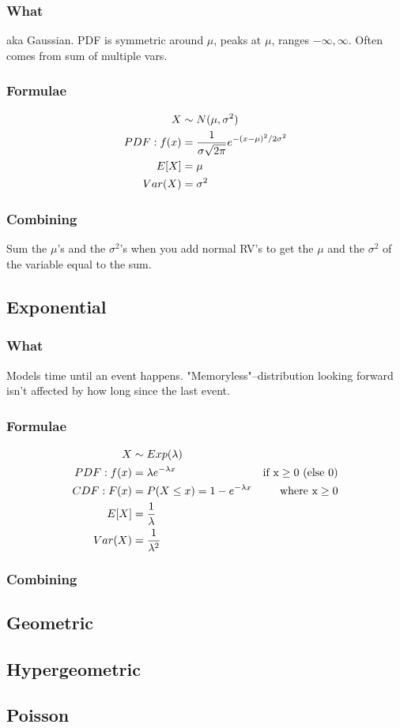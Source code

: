 \documentclass[12pt]{amsart}
\begin{document}
\subsubsection{What}
aka Gaussian. PDF is symmetric around $\mu$, peaks at $\mu$, ranges $-\infty, \infty$. Often comes from sum of multiple vars.
\subsubsection{Formulae}
\begin{align*}
X &\sim N(\mu, \sigma^2) \\
PDF: f(x) &= {1 \over \sigma \sqrt{2\pi}} e^{-(x-\mu)^2 / 2 \sigma^2} \\
E[X] &= \mu \\
Var(X) &= \sigma^2
\end{align*}
\subsubsection{Combining}
Sum the $\mu$'s and the $\sigma^2$'s when you add normal RV's to get the $\mu$ and the $\sigma^2$ of the variable equal to the sum.
%
\subsection{Exponential}
\subsubsection{What}
Models time until an event happens. "Memoryless"--distribution looking forward isn't affected by how long since the last event.
\subsubsection{Formulae}
\begin{align*}
X &\sim Exp(\lambda) \\
PDF: f(x) &= \lambda e^{-\lambda x} & \text{if x} \geq 0 \text{ (else 0)} \\
CDF: F(x) &= P(X \leq x) = 1 - e^{-\lambda x} & \text{where x} \geq 0 \\
E[X] &= {1 \over \lambda} \\
Var(X) &= {1 \over \lambda^2}
\end{align*}
\subsubsection{Combining}
%
\subsection{Geometric}
%
\subsection{Hypergeometric}
%
\subsection{Poisson}
\end{document}
